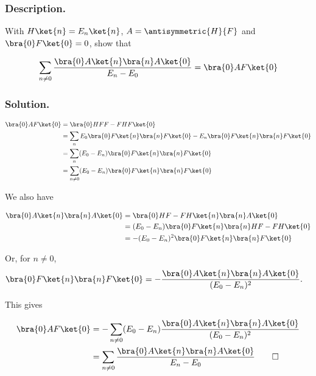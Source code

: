 \subsubsection{Description. }

With $H \ket{n} = E_n \ket{n}$, $A = \antisymmetric{H}{F}$ and $\bra{0} F \ket{0} = 0$, show that

\begin{align}\label{eqn:desaiCh3:1000}
\sum_{n\ne 0} \frac{
\bra{0} A \ket{n} \bra{n} A \ket{0} }{E_n - E_0} = 
\bra{0} AF \ket{0}
\end{align}

\subsubsection{Solution. }

\begin{align*}
\bra{0} AF \ket{0}
&=
\bra{0} HF F - FH F\ket{0} \\
&=
\sum_n E_0 \bra{0} F \ket{n}\bra{n} F \ket{0} - E_n \bra{0} F \ket{n} \bra{n} F\ket{0} \\
&=
\sum_n (E_0 -E_n) \bra{0} F \ket{n}\bra{n} F \ket{0}  \\
&=
\sum_{n\ne0} (E_0 -E_n) \bra{0} F \ket{n}\bra{n} F \ket{0}  \\
\end{align*}

We also have

\begin{align*}
\bra{0} A \ket{n} \bra{n} A \ket{0}
&=
\bra{0} HF -F H \ket{n} \bra{n} A \ket{0} \\
&=
(E_0 - E_n) \bra{0} F \ket{n} \bra{n} HF - FH \ket{0} \\
&=
-(E_0 - E_n)^2 \bra{0} F \ket{n} \bra{n} F \ket{0} \\
\end{align*}

Or, for $n \ne 0$, 
\begin{align*}
\bra{0} F \ket{n} \bra{n} F \ket{0} &=
-\frac{\bra{0} A \ket{n} \bra{n} A \ket{0}}{(E_0 - E_n)^2 }.
\end{align*}

This gives

\begin{align*}
\bra{0} AF \ket{0}
&=
-\sum_{n\ne0} (E_0 -E_n) \frac{\bra{0} A \ket{n} \bra{n} A \ket{0}}{(E_0 - E_n)^2 } \\
&=
\sum_{n\ne0} \frac{\bra{0} A \ket{n} \bra{n} A \ket{0}}{E_n - E_0 } 
\qquad\square
\end{align*}

